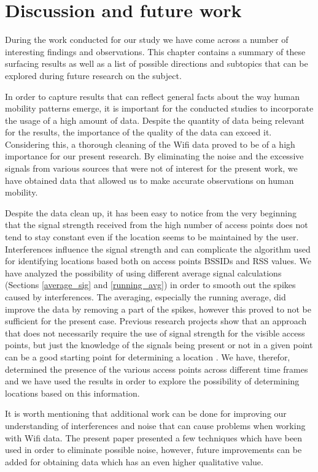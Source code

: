 \chapter{Discussion and future work}

During the work conducted for our study we have come across a number of
interesting findings and observations. This chapter contains a summary of these
surfacing results as well as a list of possible directions and subtopics that
can be explored during future research on the subject.

In order to capture results that can reflect general facts about the way human
mobility patterns emerge, it is important for the conducted studies to
incorporate the usage of a high amount of data. Despite the quantity of data
being relevant for the results, the importance of the quality of the data can
exceed it. Considering this, a thorough cleaning of the Wifi data proved to be
of a high importance for our present research. By eliminating the noise and the
excessive signals from various sources that were not of interest for the present
work, we have obtained data that allowed us to make accurate observations on
human mobility.

Despite the data clean up, it has been easy to notice from the very beginning
that the signal strength received from the high number of access points does not
tend to stay constant even if the location seems to be maintained by the user.
Interferences influence the signal strength \cite{MahantiCWA10} and can
complicate the algorithm used for identifying locations based both on access
points BSSIDs and RSS values. We have analyzed the possibility of using
different average signal calculations (Sections \ref{average_sig} and
\ref{running_avg}) in order to smooth out the spikes caused by interferences.
The averaging, especially the running average, did improve the data by removing
a part of the spikes, however this proved to not be sufficient for the present
case. Previous research projects show that an approach that does not necessarily
require the use of signal strength for the visible access points, but just the
knowledge of the signals being present or not in a given point can be a good
starting point for determining a location
\cite{Larsen:2009:MCT:1813042.1813063}. We have, therefor, determined the
presence of the various access points across different time frames and we have
used the results in order to explore the possibility of determining locations
based on this information.

It is worth mentioning that additional work can be done for improving our
understanding of interferences and noise that can cause problems when working
with Wifi data. The present paper presented a few techniques which have been used in
order to eliminate possible noise, however, future improvements can be added for
obtaining data which has an even higher qualitative value.

